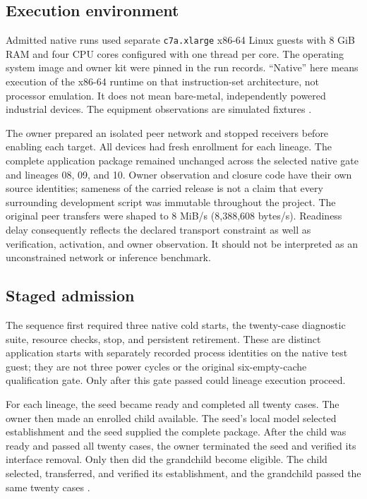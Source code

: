 \documentclass[11pt,letterpaper]{article}
\begin{document}
\subsection{Execution environment}

Admitted native runs used separate \texttt{c7a.xlarge} x86-64 Linux guests with
8 GiB RAM and four CPU cores configured with one thread per core. The operating
system image and owner kit were pinned in the run records. ``Native'' here
means execution of the x86-64 runtime on that instruction-set architecture,
not processor emulation. It does not mean bare-metal, independently powered
industrial devices. The equipment observations are simulated fixtures
\cite{native,lineages}.

The owner prepared an isolated peer network and stopped receivers before
enabling each target. All devices had fresh enrollment for each lineage.
The complete application package remained unchanged across the selected native
gate and lineages 08, 09, and 10. Owner observation and closure code have their
own source identities; sameness of the carried release is not a claim that
every surrounding development script was immutable throughout the project.
The original peer transfers were shaped to 8 MiB/s (8,388,608 bytes/s).
Readiness delay consequently reflects the declared transport constraint as
well as verification, activation, and owner observation. It should not be
interpreted as an unconstrained network or inference benchmark.

\subsection{Staged admission}

The sequence first required three native cold starts, the twenty-case diagnostic
suite, resource checks, stop, and persistent retirement. These are distinct
application starts with separately recorded process identities on the native
test guest; they are not three power cycles or the original six-empty-cache
qualification gate. Only after this gate passed could lineage execution proceed.

For each lineage, the seed became ready and completed all twenty cases. The
owner then made an enrolled child available. The seed's local model selected
establishment and the seed supplied the complete package. After the child was
ready and passed all twenty cases, the owner terminated the seed and verified
its interface removal. Only then did the grandchild become eligible. The child
selected, transferred, and verified its establishment, and the grandchild passed
the same twenty cases \cite{lineages}.
\end{document}
